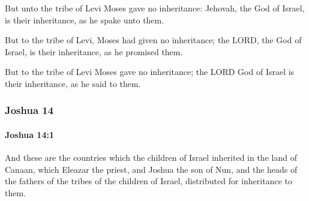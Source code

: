 			\begin{versebox}
					\item[BHS] 
					\item[ASV] But unto the tribe of Levi Moses gave no inheritance: Jehovah, the God of Israel, is their inheritance, as he spake unto them.
					\item[NIV] But to the tribe of Levi, Moses had given no inheritance; the LORD, the God of Israel, is their inheritance, as he promised them.
					\item[NRSV] But to the tribe of Levi Moses gave no inheritance; the LORD God of Israel is their inheritance, as he said to them.
			\end{versebox}
	\subsubsection{Joshua 14} %
		\label{JOSHUA-14}

		\paragraph{Joshua 14:1} %
			\label{JOSHUA-14-1}

			And these are the countries which the children of Israel inherited in the land of Canaan, which Eleazar the priest, and Joshua the son of Nun, and the heads of the fathers of the tribes of the children of Israel, distributed for inheritance to them.

